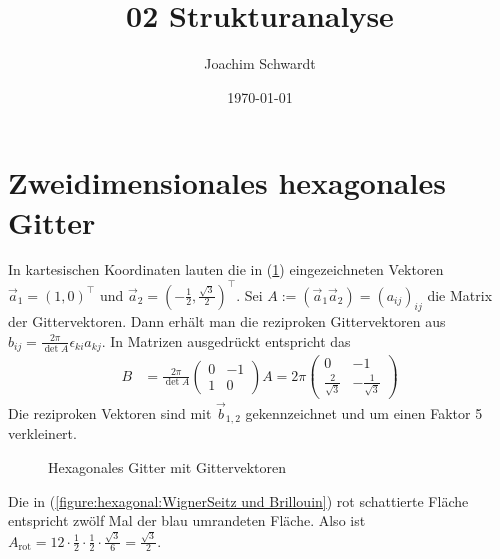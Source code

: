 \documentclass[a4paper,12pt]{article}
\newcommand{\tecxt}{}
\begin{document}
\title{02 Strukturanalyse}
\author{Joachim Schwardt}
\date{\today}
\maketitle

\section{Zweidimensionales hexagonales Gitter}
In kartesischen Koordinaten lauten die in (\ref{figure:Hexagonales Gitter mit Gittervektoren}) eingezeichneten Vektoren $\vec{a}_1=(1,0)^\top$ und $\vec{a}_2=(-\frac{1}{2},\frac{\sqrt{3}}{2})^\top$. Sei $A:=(\vec{a}_1\vec{a}_2)=(a_{ij})_{ij}$ die Matrix der Gittervektoren. Dann erhält man die reziproken Gittervektoren aus $b_{ij}=\frac{2\pi}{\det A}\epsilon_{ki}a_{kj}$. In Matrizen ausgedrückt entspricht das
\begin{align*}
B&=\frac{2\pi}{\det A}\begin{pmatrix}
0&-1\\1&0
\end{pmatrix}A=2\pi\begin{pmatrix}
0&-1\\\frac{2}{\sqrt{3}}&-\frac{1}{\sqrt{3}}
\end{pmatrix}
\end{align*}
Die reziproken Vektoren sind mit $\vec{b}_{1,2}$ gekennzeichnet und um einen Faktor 5 verkleinert.
\begin{figure}[h!]
\centering
{}
\caption{Hexagonales Gitter mit Gittervektoren}
\label{figure:Hexagonales Gitter mit Gittervektoren}
\end{figure}\newpage
Die in (\ref{figure:hexagonal:WignerSeitz und Brillouin}) rot schattierte Fläche entspricht zwölf Mal der blau umrandeten Fläche. Also ist $A_\tecxt\text{rot}=12\cdot \frac{1}{2}\cdot\frac{1}{2}\cdot\frac{\sqrt{3}}{6}=\frac{\sqrt{3}}{2}$.
\end{document}
